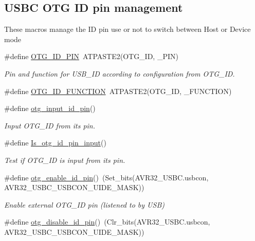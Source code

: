 \subsection*{\-U\-S\-B\-C \-O\-T\-G \-I\-D pin management}
\label{_amgrp233477b48fb98e7cebdb297ab0a04a74}%
 \-These macros manage the \-I\-D pin use or not to switch between \-Host or \-Device mode \begin{DoxyCompactItemize}
\item 
\#define \hyperlink{group__otg__group_ga1eac01e72e370946e44c6e372e77a394}{\-O\-T\-G\-\_\-\-I\-D\-\_\-\-P\-I\-N}~\-A\-T\-P\-A\-S\-T\-E2(\-O\-T\-G\-\_\-\-I\-D, \-\_\-\-P\-I\-N)
\begin{DoxyCompactList}\small\item\em \-Pin and function for \-U\-S\-B\-\_\-\-I\-D according to configuration from \-O\-T\-G\-\_\-\-I\-D. \end{DoxyCompactList}\item 
\#define \hyperlink{group__otg__group_ga67896e3d73053c7c3abfa5956dc47dbd}{\-O\-T\-G\-\_\-\-I\-D\-\_\-\-F\-U\-N\-C\-T\-I\-O\-N}~\-A\-T\-P\-A\-S\-T\-E2(\-O\-T\-G\-\_\-\-I\-D, \-\_\-\-F\-U\-N\-C\-T\-I\-O\-N)
\item 
\#define \hyperlink{group__otg__group_gaa8520a37f119fe71fa225da806595233}{otg\-\_\-input\-\_\-id\-\_\-pin}()
\begin{DoxyCompactList}\small\item\em \-Input \-O\-T\-G\-\_\-\-I\-D from its pin. \end{DoxyCompactList}\item 
\#define \hyperlink{group__otg__group_gaf5cc6e51a0bd88c118f63a999e7cf759}{\-Is\-\_\-otg\-\_\-id\-\_\-pin\-\_\-input}()
\begin{DoxyCompactList}\small\item\em \-Test if \-O\-T\-G\-\_\-\-I\-D is input from its pin. \end{DoxyCompactList}\item 
\#define \hyperlink{group__otg__group_ga8c345f8663b1f3432cb9882298e90a5b}{otg\-\_\-enable\-\_\-id\-\_\-pin}()~(\-Set\-\_\-bits(\-A\-V\-R32\-\_\-\-U\-S\-B\-C.\-usbcon, \-A\-V\-R32\-\_\-\-U\-S\-B\-C\-\_\-\-U\-S\-B\-C\-O\-N\-\_\-\-U\-I\-D\-E\-\_\-\-M\-A\-S\-K))
\begin{DoxyCompactList}\small\item\em \-Enable external \-O\-T\-G\-\_\-\-I\-D pin (listened to by \-U\-S\-B) \end{DoxyCompactList}\item 
\#define \hyperlink{group__otg__group_ga8ad60737541846833dbddf8e92828e40}{otg\-\_\-disable\-\_\-id\-\_\-pin}()~(\-Clr\-\_\-bits(\-A\-V\-R32\-\_\-\-U\-S\-B\-C.\-usbcon, \-A\-V\-R32\-\_\-\-U\-S\-B\-C\-\_\-\-U\-S\-B\-C\-O\-N\-\_\-\-U\-I\-D\-E\-\_\-\-M\-A\-S\-K))

\end{DoxyCompactItemize}
